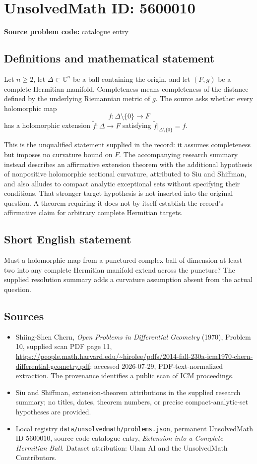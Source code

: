 \documentclass[11pt]{article}
\begin{document}
\section*{UnsolvedMath ID: 5600010}
\textbf{Source problem code:} catalogue entry
\subsection{Definitions and mathematical statement}
Let $n\geq2$, let $\Delta\subset\mathbb C^n$ be a ball containing the origin, and let $(F,g)$ be a complete Hermitian manifold. Completeness means completeness of the distance defined by the underlying Riemannian metric of $g$. The source asks whether every holomorphic map
\[
f:\Delta\setminus\{0\}\longrightarrow F
\]
has a holomorphic extension $\widetilde f:\Delta\to F$ satisfying $\widetilde f|_{\Delta\setminus\{0\}}=f$.

This is the unqualified statement supplied in the record: it assumes completeness but imposes no curvature bound on $F$. The accompanying research summary instead describes an affirmative extension theorem with the additional hypothesis of nonpositive holomorphic sectional curvature, attributed to Siu and Shiffman, and also alludes to compact analytic exceptional sets without specifying their conditions. That stronger target hypothesis is not inserted into the original question. A theorem requiring it does not by itself establish the record's affirmative claim for arbitrary complete Hermitian targets.
\subsection{Short English statement}
Must a holomorphic map from a punctured complex ball of dimension at least two into any complete Hermitian manifold extend across the puncture? The supplied resolution summary adds a curvature assumption absent from the actual question.
\subsection{Sources}
\begin{itemize}
\item Shiing-Shen Chern, \emph{Open Problems in Differential Geometry} (1970), Problem 10, supplied scan PDF page 11, \url{https://people.math.harvard.edu/~hirolee/pdfs/2014-fall-230a-icm1970-chern-differential-geometry.pdf}; accessed 2026-07-29, PDF-text-normalized extraction. The provenance identifies a public scan of ICM proceedings.
\item Siu and Shiffman, extension-theorem attributions in the supplied research summary; no titles, dates, theorem numbers, or precise compact-analytic-set hypotheses are provided.
\item Local registry \texttt{data/unsolvedmath/problems.json}, permanent UnsolvedMath ID $5600010$, source code catalogue entry, \emph{Extension into a Complete Hermitian Ball}. Dataset attribution: Ulam AI and the UnsolvedMath Contributors.
\end{itemize}
\end{document}
